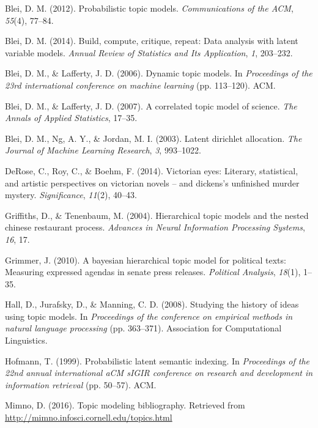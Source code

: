 \documentclass[12pt,]{article}
\begin{document}
\hypertarget{refs}{}
\hypertarget{ref-blei2012probabilistic}{}
Blei, D. M. (2012). Probabilistic topic models. \emph{Communications of
the ACM}, \emph{55}(4), 77--84.

\hypertarget{ref-blei2014build}{}
Blei, D. M. (2014). Build, compute, critique, repeat: Data analysis with
latent variable models. \emph{Annual Review of Statistics and Its
Application}, \emph{1}, 203--232.

\hypertarget{ref-blei2006dynamic}{}
Blei, D. M., \& Lafferty, J. D. (2006). Dynamic topic models. In
\emph{Proceedings of the 23rd international conference on machine
learning} (pp. 113--120). ACM.

\hypertarget{ref-blei2007correlated}{}
Blei, D. M., \& Lafferty, J. D. (2007). A correlated topic model of
science. \emph{The Annals of Applied Statistics}, 17--35.

\hypertarget{ref-blei2003latent}{}
Blei, D. M., Ng, A. Y., \& Jordan, M. I. (2003). Latent dirichlet
allocation. \emph{The Journal of Machine Learning Research}, \emph{3},
993--1022.

\hypertarget{ref-derose2014victorian}{}
DeRose, C., Roy, C., \& Boehm, F. (2014). Victorian eyes: Literary,
statistical, and artistic perspectives on victorian novels -- and
dickens's unfinished murder mystery. \emph{Significance}, \emph{11}(2),
40--43.

\hypertarget{ref-griffiths2004hierarchical}{}
Griffiths, D., \& Tenenbaum, M. (2004). Hierarchical topic models and
the nested chinese restaurant process. \emph{Advances in Neural
Information Processing Systems}, \emph{16}, 17.

\hypertarget{ref-grimmer2010bayesian}{}
Grimmer, J. (2010). A bayesian hierarchical topic model for political
texts: Measuring expressed agendas in senate press releases.
\emph{Political Analysis}, \emph{18}(1), 1--35.

\hypertarget{ref-hall2008studying}{}
Hall, D., Jurafsky, D., \& Manning, C. D. (2008). Studying the history
of ideas using topic models. In \emph{Proceedings of the conference on
empirical methods in natural language processing} (pp. 363--371).
Association for Computational Linguistics.

\hypertarget{ref-hofmann1999probabilistic}{}
Hofmann, T. (1999). Probabilistic latent semantic indexing. In
\emph{Proceedings of the 22nd annual international aCM sIGIR conference
on research and development in information retrieval} (pp. 50--57). ACM.

\hypertarget{ref-mimno2016topic}{}
Mimno, D. (2016). Topic modeling bibliography. Retrieved from
\url{http://mimno.infosci.cornell.edu/topics.html}
\end{document}
